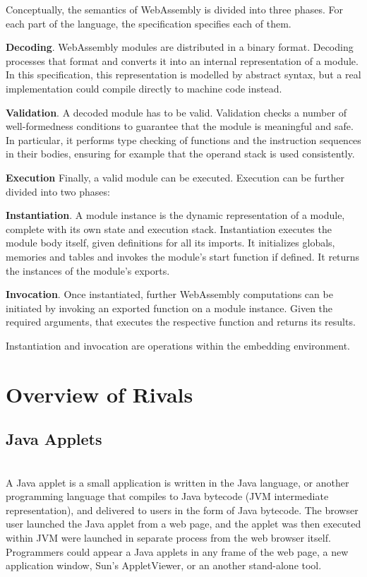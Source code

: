 \indent Conceptually, the semantics of WebAssembly is divided into three phases. For each part of the language, the specification specifies each of them.

\textbf{Decoding}. WebAssembly modules are distributed in a binary format. Decoding processes that format and converts it into an internal representation of a module. In this specification, this representation is modelled by abstract syntax, but a real implementation could compile directly to machine code instead.
  
\textbf{Validation}. A decoded module has to be valid. Validation checks a number of well-formedness conditions to guarantee that the module is meaningful and safe. In particular, it performs type checking of functions and the instruction sequences in their bodies, ensuring for example that the operand stack is used consistently.

\textbf{Execution} Finally, a valid module can be executed. Execution can be further divided into two phases:

\textbf{Instantiation}. A module instance is the dynamic representation of a module, complete with its own state and execution stack. Instantiation executes the module body itself, given definitions for all its imports. It initializes globals, memories and tables and invokes the module’s start function if defined. It returns the instances of the module’s exports.

\textbf{Invocation}. Once instantiated, further WebAssembly computations can be initiated by invoking an exported function on a module instance. Given the required arguments, that executes the respective function and returns its results.

Instantiation and invocation are operations within the embedding environment.

\section{Overview of Rivals}
\subsection{Java Applets} \mbox{}\\
\indent A Java applet is a small application is written in the Java language, or another programming language that compiles to Java bytecode (JVM intermediate representation), and delivered to users in the form of Java bytecode. 
The browser user launched the Java applet from a web page, and the applet was then executed within JVM were launched in separate process from the web browser itself. 
Programmers could appear a Java applets in any frame of the web page, a new application window, Sun's AppletViewer, or an another stand-alone tool.

